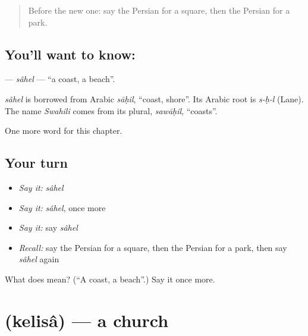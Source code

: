 \label{lesson:FA-C87-sahel}



\begin{quote}
Before the new one: say the Persian for a square, then the Persian for a park.
\end{quote}

\subsection*{You'll want to know: }
\textbf{} — \emph{sâhel} — \textquotedblleft{}a coast, a beach\textquotedblright{}.

\begin{cousinweb}
\emph{sâhel} is borrowed from Arabic \emph{sāḥil}, \textquotedblleft{}coast, shore\textquotedblright{}. Its Arabic root is \emph{s-ḥ-l} (Lane). The name \emph{Swahili} comes from its plural, \emph{sawāḥil}, \textquotedblleft{}coasts\textquotedblright{}.
\end{cousinweb}

\begin{grammarlens}[title={What you've built}]
One more word for this chapter.
\end{grammarlens}

\subsection*{Your turn}
\begin{itemize}
\raggedright
  \item \emph{Say it:} \emph{sâhel}
  \item \emph{Say it:} \emph{sâhel}, once more
  \item \emph{Say it:} say \emph{sâhel}
  \item \emph{Recall:} say the Persian for a square, then the Persian for a park, then say \emph{sâhel} again
\end{itemize}

\begin{tcolorbox}[breakable,colback=teal!4,colframe=teal!35!black,title={Before you move on}]
What does  mean? (\textquotedblleft{}A coast, a beach\textquotedblright{}.) Say it once more.
\end{tcolorbox}
\section[\texorpdfstring{\fa{کلیسا} (kelisâ)}{کلیسا (kelisâ)}]{ (kelisâ) — a church}

